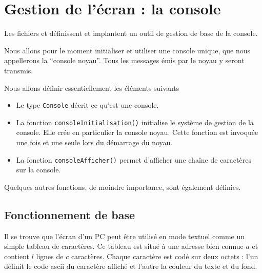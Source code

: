 %
\section{Gestion de l'écran : la console}

   Les fichiers  
et  définissent et implantent un outil de gestion de base de la
console. 

   Nous allons pour le moment initialiser et utiliser une console
unique, que nous appellerons la ``console noyau''. Tous les messages
émis par le noyau y seront transmis.

   Nous allons définir essentiellement les éléments suivants

\begin{itemize}
   \item Le type \lstinline!Console! décrit ce qu'est une console.
   \item La fonction \lstinline!consoleInitialisation()! initialise le
     système de gestion de la console. Elle crée en particulier la
     console noyau. Cette fonction est invoquée une fois et une seule
     lors du démarrage du noyau.
   \item La fonction \lstinline!consoleAfficher()! permet d'afficher
     une chaîne de caractères sur la console.
\end{itemize}  

   Quelques autres fonctions, de moindre importance, sont également
définies.
   
%
\subsection{Fonctionnement de base}

   Il se trouve que l'écran d'un PC peut être utilisé en mode textuel
comme un simple tableau de caractères. Ce tableau est situé à une
adresse bien connue $a$ et contient $l$ lignes de $c$
caractères. Chaque caractère est codé sur deux octets : l'un définit
le code {\sc ascii} du caractère affiché et l'autre la couleur du
texte et du fond. 

%

